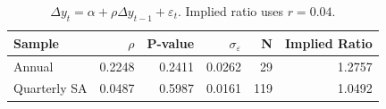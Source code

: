 \begin{table}[H]
\centering
\begin{tabular}{lrrrrr}
  \toprule
Sample & $\rho$ & P-value & $\sigma_\varepsilon$ & N & Implied Ratio \\ 
  \midrule
Annual & 0.2248 & 0.2411 & 0.0262 &    29 & 1.2757 \\ 
  Quarterly SA & 0.0487 & 0.5987 & 0.0161 &   119 & 1.0492 \\ 
   \bottomrule
\end{tabular}
\caption{$\Delta y_t = \alpha + \rho \Delta y_{t-1} + \varepsilon_t$. Implied ratio uses $r = 0.04$.}
\label{tab:q5}
\end{table}
